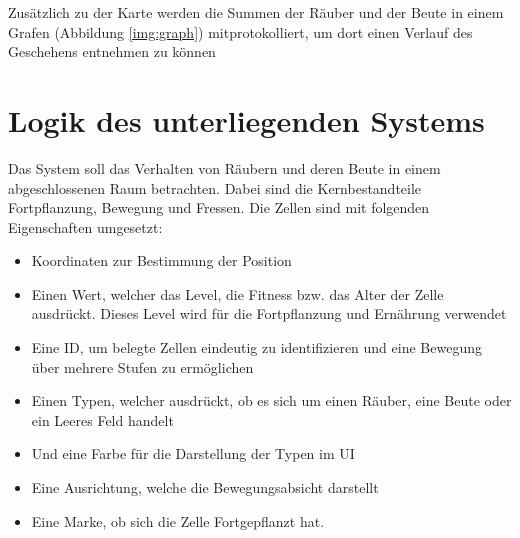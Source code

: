 \documentclass[]{scrartcl}
\begin{document}
Zusätzlich zu der Karte werden die Summen der Räuber und der Beute in einem Grafen (Abbildung \ref{img:graph}) mitprotokolliert, um dort einen Verlauf des Geschehens entnehmen zu können

\newpage
\section{Logik des unterliegenden Systems}
\label{logik}
Das System soll das Verhalten von Räubern und deren Beute in einem abgeschlossenen Raum betrachten. Dabei sind die Kernbestandteile Fortpflanzung, Bewegung und Fressen. Die Zellen sind mit folgenden Eigenschaften umgesetzt:
\begin{itemize}
	\item Koordinaten zur Bestimmung der Position
	\item Einen Wert, welcher das Level, die Fitness bzw. das Alter der Zelle ausdrückt. Dieses Level wird für die Fortpflanzung und Ernährung verwendet
	\item Eine ID, um belegte Zellen eindeutig zu identifizieren und eine Bewegung über mehrere Stufen zu ermöglichen
	\item Einen Typen, welcher ausdrückt, ob es sich um einen Räuber, eine Beute oder ein Leeres Feld handelt
	\item Und eine Farbe für die Darstellung der Typen im UI
	\item Eine Ausrichtung, welche die Bewegungsabsicht darstellt
	\item Eine Marke, ob sich die Zelle Fortgepflanzt hat.
\end{itemize}
\end{document}

